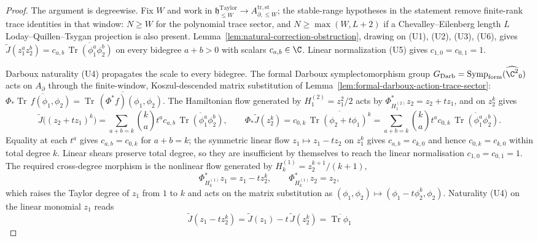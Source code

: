 \documentclass[11pt]{memoir}
\begin{document}
\begin{proof}
  The argument is degreewise.  Fix \(W\) and work in
  \(\mathfrak h^{\mathrm{Taylor}}_{\leq W}\to A_{\partial,\leq W}^{\mathrm{tr,st}}\);
  the stable-range hypotheses in the statement remove finite-rank trace
  identities in that window: \(N\geq W\) for the polynomial trace
  sector, and \(N\geq\max(W,L+2)\) if a Chevalley--Eilenberg length
  \(L\) Loday--Quillen--Tsygan projection is also present.
  Lemma~\ref{lem:natural-correction-obstruction},
  drawing on (U1), (U2), (U3), (U6), gives
  \(\widetilde J(z_1^az_2^b)=c_{a,b}\,
   \overline{\operatorname{Tr}(\phi_1^a\phi_2^b)}\) on every bidegree
  \(a+b>0\) with scalars \(c_{a,b}\in\C\).  Linear normalization (U5)
  gives \(c_{1,0}=c_{0,1}=1\).

  Darboux naturality (U4) propagates the scale to every bidegree.
  The formal Darboux symplectomorphism group
  \(G_{\mathrm{Darb}}=\operatorname{Symp}_{\mathrm{form}}(\widehat{\C^2}_0)\)
  acts on \(A_\partial\) through the finite-window, Koszul-descended
  matrix substitution of
  Lemma~\ref{lem:formal-darboux-action-trace-sector}:
  \(\Phi_*\overline{\operatorname{Tr}\,f(\phi_1,\phi_2)}
   =\overline{\operatorname{Tr}\,(\Phi^*f)(\phi_1,\phi_2)}\).  The
  Hamiltonian flow generated by \(H_1^{(2)}=z_1^2/2\) acts by
  \(\Phi^*_{H_1^{(2)}}z_2=z_2+tz_1\), and on \(z_2^k\) gives
  \[
    \widetilde J\bigl((z_2+tz_1)^k\bigr)
     =\sum_{a+b=k}\binom{k}{a}t^a c_{a,b}\,
       \overline{\operatorname{Tr}(\phi_1^a\phi_2^b)},
    \qquad
    \Phi_*\widetilde J(z_2^k)
     =c_{0,k}\,\overline{\operatorname{Tr}(\phi_2+t\phi_1)^k}
     =\sum_{a+b=k}\binom{k}{a}t^a c_{0,k}\,
       \overline{\operatorname{Tr}(\phi_1^a\phi_2^b)}.
  \]
  Equality at each \(t^a\) gives \(c_{a,b}=c_{0,k}\) for \(a+b=k\);
  the symmetric linear flow \(z_1\mapsto z_1-tz_2\) on \(z_1^k\) gives
  \(c_{a,b}=c_{k,0}\) and hence \(c_{0,k}=c_{k,0}\) within total
  degree \(k\).  Linear shears preserve total degree, so they are
  insufficient by themselves to reach the linear normalisation
  \(c_{1,0}=c_{0,1}=1\).  The required cross-degree morphism is the
  nonlinear flow generated by \(H_k^{(1)}=z_2^{k+1}/(k+1)\),
  \[
    \Phi^*_{H_k^{(1)}}z_1=z_1-tz_2^k,\qquad
    \Phi^*_{H_k^{(1)}}z_2=z_2,
  \]
  which raises the Taylor degree of \(z_1\) from \(1\) to \(k\) and
  acts on the matrix substitution as
  \((\phi_1,\phi_2)\mapsto(\phi_1-t\phi_2^k,\phi_2)\).  Naturality
  (U4) on the linear monomial \(z_1\) reads
  \[
    \widetilde J(z_1-tz_2^k)
     =\widetilde J(z_1)-t\,\widetilde J(z_2^k)
     =\overline{\operatorname{Tr}\phi_1}
\]
\end{proof}
\end{document}
